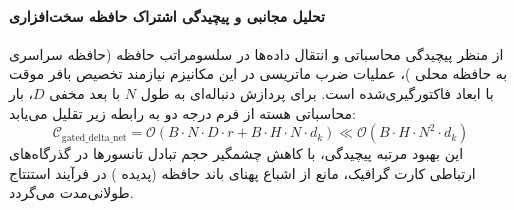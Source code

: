 \paragraph{تحلیل مجانبی و پیچیدگی اشتراک حافظه سخت‌افزاری}
از منظر پیچیدگی محاسباتی و انتقال داده‌ها در سلسومراتب حافظه (حافظه سراسری  به حافظه محلی )، عملیات ضرب ماتریسی در این مکانیزم نیازمند تخصیص بافر موقت با ابعاد فاکتورگیری‌شده است. برای پردازش دنباله‌ای به طول $N$ با بعد مخفی $D$، بار محاسباتی هسته از فرم درجه دو به رابطه زیر تقلیل می‌یابد:
\begin{equation}
\label{eq:complexity_gated_delta_net}
\mathcal{C}_{\text{gated\_delta\_net}} = \mathcal{O}\left( B \cdot N \cdot D \cdot r + B \cdot H \cdot N \cdot d_k \right) \ll \mathcal{O}\left( B \cdot H \cdot N^2 \cdot d_k \right)
\end{equation}
این بهبود مرتبه پیچیدگی، با کاهش چشمگیر حجم تبادل تانسورها در گذرگاه‌های ارتباطی کارت گرافیک، مانع از اشباع پهنای باند حافظه (پدیده ) در فرآیند استنتاج طولانی‌مدت می‌گردد.
